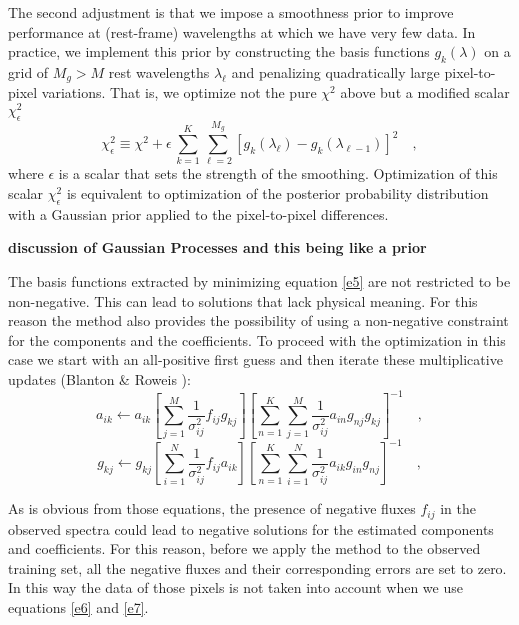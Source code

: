 \documentclass[apj]{emulateapj}
\begin{document}
The second adjustment is that we impose a smoothness prior to improve performance at (rest-frame) wavelengths at which we have very few data. In practice, we implement this prior by constructing the basis functions $g_k(\lambda)$ on a grid of $M_g>M$ rest wavelengths $\lambda_{\ell}$ and penalizing quadratically large pixel-to-pixel variations. That is, we optimize not the pure $\chi^2$ above but a modified scalar $\chi_{\epsilon}^2$
\begin{equation}\label{e5}
\chi_{\epsilon}^2 \equiv \chi^2
 + \epsilon\,\sum_{k=1}^K \sum_{\ell=2}^{M_g}
 \left[g_k(\lambda_{\ell})-g_k(\lambda_{\ell-1})\right]^2
\quad ,
\end{equation}
where $\epsilon$ is a scalar that sets the strength of the smoothing. Optimization of this scalar $\chi_{\epsilon}^2$ is equivalent to
optimization of the posterior probability distribution with a Gaussian prior applied to the pixel-to-pixel differences.

\textbf{discussion of Gaussian Processes and this being like a prior}

The basis functions extracted by minimizing equation \ref{e5} are not restricted to be non-negative. This can lead to solutions that lack physical meaning. For this reason the method also provides the possibility of using a non-negative constraint for the components and the coefficients. To proceed with the optimization in this case we start with an all-positive first guess and then iterate these multiplicative updates (Blanton \& Roweis \citealt{blanton}):
\begin{equation}\label{e6}
a_{ik} \gets a_{ik}\left[\sum_{j=1}^{M}\frac{1}{\sigma^2_{ij}}f_{ij}g_{kj}\right]\left[\sum_{n=1}^{K}\sum_{j=1}^{M}\frac{1}{\sigma^2_{ij}}a_{in}g_{nj}g_{kj}\right]^{-1}
\quad ,
\end{equation}
\begin{equation}\label{e7}
g_{kj} \gets g_{kj}\left[\sum_{i=1}^{N}\frac{1}{\sigma^2_{ij}}f_{ij}a_{ik}\right]\left[\sum_{n=1}^{K}\sum_{i=1}^{N}\frac{1}{\sigma^2_{ij}}a_{ik}g_{in}g_{nj}\right]^{-1}
\quad ,
\end{equation}

As is obvious from those equations, the presence of negative fluxes $f_{ij}$ in the observed spectra could lead to negative solutions for the estimated components and coefficients. For this reason, before we apply the method to the observed training set, all the negative fluxes and their corresponding errors are set to zero. In this way the data of those pixels is not taken into account when we use equations \ref{e6} and \ref{e7}.
\end{document}
